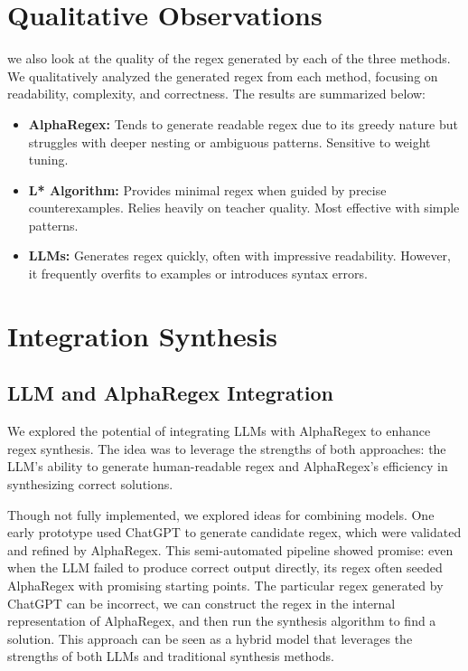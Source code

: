 \section{Qualitative Observations}

\indent\indent we also look at the quality of the regex generated by each of the three methods. We qualitatively analyzed the generated regex from each method, focusing on readability, complexity, and correctness. The results are summarized below:

\begin{itemize}
\item \textbf{AlphaRegex:} Tends to generate readable regex due to its greedy nature but struggles with deeper nesting or ambiguous patterns. Sensitive to weight tuning.
\item \textbf{L* Algorithm:} Provides minimal regex when guided by precise counterexamples. Relies heavily on teacher quality. Most effective with simple patterns.
\item \textbf{LLMs:} Generates regex quickly, often with impressive readability. However, it frequently overfits to examples or introduces syntax errors.
\end{itemize}

\section{Integration Synthesis}

\subsection{LLM and AlphaRegex Integration}
\indent\indent We explored the potential of integrating LLMs with AlphaRegex to enhance regex synthesis. The idea was to leverage the strengths of both approaches: the LLM's ability to generate human-readable regex and AlphaRegex's efficiency in synthesizing correct solutions.

\indent\indent Though not fully implemented, we explored ideas for combining models. One early prototype used ChatGPT to generate candidate regex, which were validated and refined by AlphaRegex. This semi-automated pipeline showed promise: even when the LLM failed to produce correct output directly, its regex often seeded AlphaRegex with promising starting points. The particular regex generated by ChatGPT can be incorrect, we can construct the regex in the internal representation of AlphaRegex, and then run the synthesis algorithm to find a solution. This approach can be seen as a hybrid model that leverages the strengths of both LLMs and traditional synthesis methods. 

